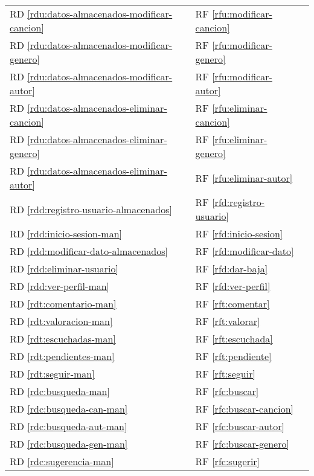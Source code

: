 \documentclass[
  12pt,
  a4paper,
  DIV=12,
  spanish,
]{scrartcl}
\newcounter{RF}
\newcounter{RD}
\begin{document}
\begin{tabularx}{\linewidth}{l|XXX}
  RD \ref{rdu:datos-almacenados-modificar-cancion} & & RF \ref{rfu:modificar-cancion} & \\
  RD \ref{rdu:datos-almacenados-modificar-genero} & & RF \ref{rfu:modificar-genero} & \\
  RD \ref{rdu:datos-almacenados-modificar-autor} & & RF \ref{rfu:modificar-autor} &\\
  RD \ref{rdu:datos-almacenados-eliminar-cancion} & & RF \ref{rfu:eliminar-cancion} & \\
  RD \ref{rdu:datos-almacenados-eliminar-genero}&  & RF \ref{rfu:eliminar-genero} & \\
  RD \ref{rdu:datos-almacenados-eliminar-autor} & & RF \ref{rfu:eliminar-autor} &\\

  RD \ref{rdd:registro-usuario-almacenados} & & RF \ref{rfd:registro-usuario} & \\
  RD \ref{rdd:inicio-sesion-man} & & RF \ref{rfd:inicio-sesion} & \\
  RD \ref{rdd:modificar-dato-almacenados} & & RF \ref{rfd:modificar-dato} & \\
  RD \ref{rdd:eliminar-usuario} & & RF \ref{rfd:dar-baja} & \\
  RD \ref{rdd:ver-perfil-man} & & RF \ref{rfd:ver-perfil} & \\
  RD \ref{rdt:comentario-man} & & RF \ref{rft:comentar} & \\
  RD \ref{rdt:valoracion-man} & & RF \ref{rft:valorar} & \\
  RD \ref{rdt:escuchadas-man} & & RF \ref{rft:escuchada} & \\
  RD \ref{rdt:pendientes-man} & & RF \ref{rft:pendiente} & \\
  RD \ref{rdt:seguir-man} & & RF \ref{rft:seguir} & \\
  RD \ref{rdc:busqueda-man} && RF \ref{rfc:buscar} & \\
  RD \ref{rdc:busqueda-can-man} && RF \ref{rfc:buscar-cancion} & \\
  RD \ref{rdc:busqueda-aut-man} && RF \ref{rfc:buscar-autor} & \\
  RD \ref{rdc:busqueda-gen-man} && RF \ref{rfc:buscar-genero} & \\
  RD \ref{rdc:sugerencia-man} && RF \ref{rfc:sugerir} & \\



\end{tabularx}
\end{document}
